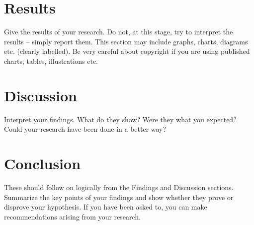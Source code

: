 \documentclass[10pt, a4paper, twocolumn]{article} %
\begin{document}
\section{Results}

Give the results of your research. Do not, at this stage, try to interpret the results – simply report them. 
This section may include graphs, charts, diagrams etc. (clearly labelled). Be very careful about copyright if you are using published charts, tables, illustrations etc.


\section{Discussion}

Interpret your findings. What do they show? Were they what you expected? 
Could your research have been done in a better way?

\section{Conclusion}

These should follow on logically from the Findings and Discussion sections. Summarize the key points of your findings and show whether they prove or disprove your hypothesis. 
If you have been asked to, you can make recommendations arising from your research.


\printbibliography[title={Bibliography}] %


\end{document}
